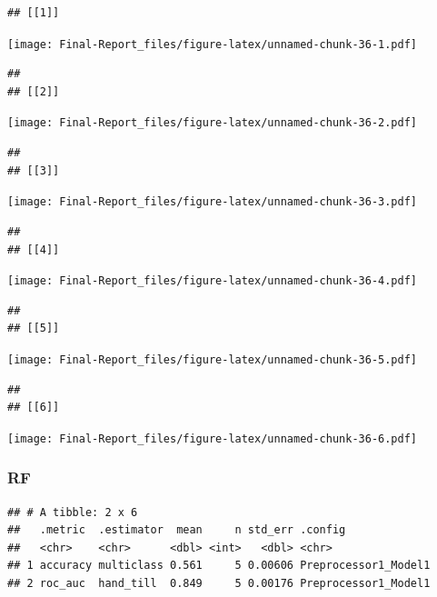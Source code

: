 \documentclass[
]{article}
\newenvironment{Shaded}{\begin{snugshade}}{\end{snugshade}}
\newcommand{\FunctionTok}[1]{\textcolor[rgb]{0.00,0.00,0.00}{#1}}
\newcommand{\NormalTok}[1]{#1}
\newcommand{\OtherTok}[1]{\textcolor[rgb]{0.56,0.35,0.01}{#1}}
\newcommand{\SpecialCharTok}[1]{\textcolor[rgb]{0.00,0.00,0.00}{#1}}
\begin{document}
\begin{verbatim}
## [[1]]
\end{verbatim}

\texttt{[image: Final-Report\_files/figure-latex/unnamed-chunk-36-1.pdf]}

\begin{verbatim}
## 
## [[2]]
\end{verbatim}

\texttt{[image: Final-Report\_files/figure-latex/unnamed-chunk-36-2.pdf]}

\begin{verbatim}
## 
## [[3]]
\end{verbatim}

\texttt{[image: Final-Report\_files/figure-latex/unnamed-chunk-36-3.pdf]}

\begin{verbatim}
## 
## [[4]]
\end{verbatim}

\texttt{[image: Final-Report\_files/figure-latex/unnamed-chunk-36-4.pdf]}

\begin{verbatim}
## 
## [[5]]
\end{verbatim}

\texttt{[image: Final-Report\_files/figure-latex/unnamed-chunk-36-5.pdf]}

\begin{verbatim}
## 
## [[6]]
\end{verbatim}

\texttt{[image: Final-Report\_files/figure-latex/unnamed-chunk-36-6.pdf]}

\hypertarget{rf-1}{%
\subsubsection{RF}\label{rf-1}}

\begin{Shaded}
\end{Shaded}

\begin{verbatim}
## # A tibble: 2 x 6
##   .metric  .estimator  mean     n std_err .config             
##   <chr>    <chr>      <dbl> <int>   <dbl> <chr>               
## 1 accuracy multiclass 0.561     5 0.00606 Preprocessor1_Model1
## 2 roc_auc  hand_till  0.849     5 0.00176 Preprocessor1_Model1
\end{verbatim}
\end{document}
